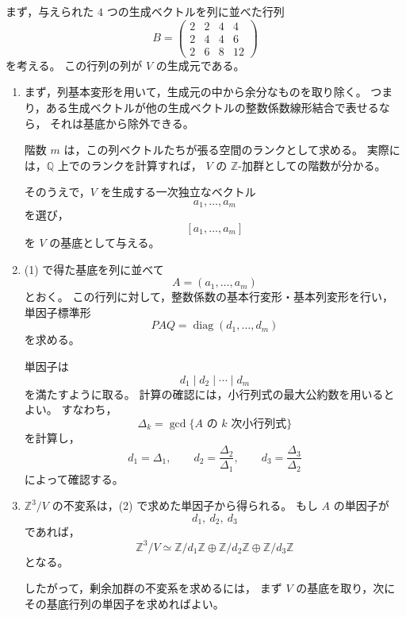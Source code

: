 \begin{strategy}
	まず，与えられた \(4\) つの生成ベクトルを列に並べた行列
	\[
	B=
	\begin{pmatrix}
		2 & 2 & 4 & 4\\
		2 & 4 & 4 & 6\\
		2 & 6 & 8 & 12
	\end{pmatrix}
	\]
	を考える。
	この行列の列が \(V\) の生成元である。
	
	\begin{enumerate}
		\item[(1)]
		まず，列基本変形を用いて，生成元の中から余分なものを取り除く。
		つまり，ある生成ベクトルが他の生成ベクトルの整数係数線形結合で表せるなら，
		それは基底から除外できる。
		
		階数 \(m\) は，この列ベクトルたちが張る空間のランクとして求める。
		実際には，\(\mathbb{Q}\) 上でのランクを計算すれば，
		\(V\) の \(\mathbb{Z}\)-加群としての階数が分かる。
		
		そのうえで，\(V\) を生成する一次独立なベクトル
		\[
		a_1,\ldots,a_m
		\]
		を選び，
		\[
		[a_1,\ldots,a_m]
		\]
		を \(V\) の基底として与える。
		
		\item[(2)]
		(1) で得た基底を列に並べて
		\[
		A=(a_1,\ldots,a_m)
		\]
		とおく。
		この行列に対して，整数係数の基本行変形・基本列変形を行い，
		単因子標準形
		\[
		PAQ=
		\operatorname{diag}(d_1,\ldots,d_m)
		\]
		を求める。
		
		単因子は
		\[
		d_1\mid d_2\mid \cdots \mid d_m
		\]
		を満たすように取る。
		計算の確認には，小行列式の最大公約数を用いるとよい。
		すなわち，
		\[
		\Delta_k
		=
		\gcd\{\text{\(A\) の \(k\) 次小行列式}\}
		\]
		を計算し，
		\[
		d_1=\Delta_1,
		\qquad
		d_2=\frac{\Delta_2}{\Delta_1},
		\qquad
		d_3=\frac{\Delta_3}{\Delta_2}
		\]
		によって確認する。
		
		\item[(3)]
		\(\mathbb{Z}^3/V\) の不変系は，(2) で求めた単因子から得られる。
		もし \(A\) の単因子が
		\[
		d_1,\ d_2,\ d_3
		\]
		であれば，
		\[
		\mathbb{Z}^3/V
		\simeq
		\mathbb{Z}/d_1\mathbb{Z}
		\oplus
		\mathbb{Z}/d_2\mathbb{Z}
		\oplus
		\mathbb{Z}/d_3\mathbb{Z}
		\]
		となる。
		
		したがって，剰余加群の不変系を求めるには，
		まず \(V\) の基底を取り，次にその基底行列の単因子を求めればよい。
	\end{enumerate}
\end{strategy}